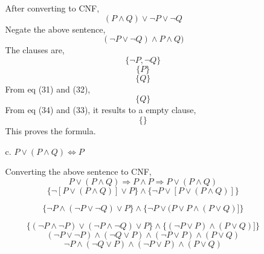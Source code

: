 \documentclass[11pt, a4paper]{report}
\begin{document}
\begin{enumerate}
\begin{itemize}
After converting to CNF,
\begin{equation}
(P \wedge Q)\vee \neg P \vee \neg Q
\end{equation}
Negate the above sentence,
\begin{equation}
(\neg P \vee \neg Q) \wedge P \wedge Q)
\end{equation}
The clauses are,
\begin{equation}
\lbrace \neg P, \neg Q \rbrace
\end{equation}
\begin{equation}
\lbrace  P \rbrace
\end{equation}
\begin{equation}
\lbrace  Q \rbrace
\end{equation}
From eq (31) and (32),
\begin{equation}
\lbrace Q \rbrace
\end{equation}
From eq (34) and (33), it results to a empty clause,
\begin{equation}
\lbrace  \rbrace
\end{equation}
This proves the formula.\\

\item[c.] $ P \vee (P\wedge Q) \Longleftrightarrow P$

Converting the above sentence to CNF,
\begin{equation}
P \vee (P \wedge Q)\Rightarrow P \wedge P \Rightarrow P \vee (P \wedge Q)
\end{equation}
\begin{equation}
\{\neg [P \vee (P\wedge Q)] \vee P\} \wedge \{\neg P \vee [P \vee (P\wedge Q)]\}
\end{equation}

\begin{equation}
\{\neg P \wedge( \neg P\vee \neg Q) \vee P\} \wedge \{\neg P \vee (P \vee P \wedge (P \vee Q)]\}
\end{equation}

\begin{equation}
\{(\neg P \wedge \neg P)\vee(\neg P \wedge \neg Q) \vee P\} \wedge \{(\neg P \vee P) \wedge (P \vee Q)]\}
\end{equation}
\begin{equation}
(\neg P \vee \neg P) \wedge(\neg Q \vee P) \wedge (\neg P \vee P) \wedge(P \vee Q)
\end{equation}
\begin{equation}
 \neg P \wedge(\neg Q \vee P) \wedge (\neg P \vee P) \wedge(P \vee Q)
\end{equation}


\end{itemize}
\end{enumerate}
\end{document}
